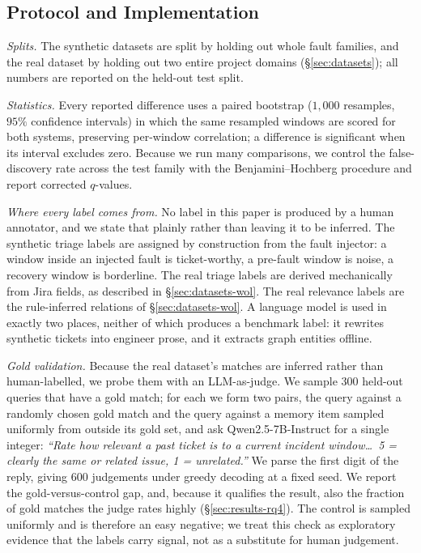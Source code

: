 \subsection{Protocol and Implementation}
\label{sec:setup-protocol}

\noindent\emph{Splits.} The synthetic datasets are split by holding out whole
fault families, and the real dataset by holding out two entire project domains
(\S\ref{sec:datasets}); all numbers are reported on the held-out test split.

\noindent\emph{Statistics.} Every reported difference uses a paired bootstrap
($1{,}000$ resamples, $95\%$ confidence intervals) in which the same resampled
windows are scored for both systems, preserving per-window correlation; a
difference is significant when its interval excludes zero. Because we run many comparisons, we control the false-discovery rate across the
test family with the Benjamini--Hochberg procedure and report corrected $q$-values.

\noindent\emph{Where every label comes from.} No label in this paper is produced
by a human annotator, and we state that plainly rather than leaving it to be
inferred. The synthetic triage labels are assigned by construction from the fault
injector: a window inside an injected fault is ticket-worthy, a pre-fault window
is noise, a recovery window is borderline. The real triage labels are derived
mechanically from Jira fields, as described in \S\ref{sec:datasets-wol}. The real
relevance labels are the rule-inferred relations of \S\ref{sec:datasets-wol}. A
language model is used in exactly two places, neither of which produces a
benchmark label: it rewrites synthetic tickets into engineer prose, and it
extracts graph entities offline.

\noindent\emph{Gold validation.} Because the real dataset's matches are inferred
rather than human-labelled, we probe them with an LLM-as-judge. We sample $300$
held-out queries that have a gold match; for each we form two pairs, the query
against a randomly chosen gold match and the query against a memory item sampled
uniformly from outside its gold set, and ask Qwen2.5-7B-Instruct for a single
integer: \emph{``Rate how relevant a past ticket is to a current incident
window\ldots\ 5 = clearly the same or related issue, 1 = unrelated.''} We parse
the first digit of the reply, giving $600$ judgements under greedy decoding at a
fixed seed. We report the gold-versus-control gap, and, because it qualifies the
result, also the fraction of gold matches the judge rates highly
(\S\ref{sec:results-rq4}). The control is sampled uniformly and is therefore an
easy negative; we treat this check as exploratory evidence that the labels carry
signal, not as a substitute for human judgement.

